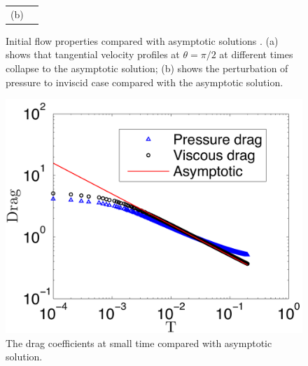 \begin{figure}
\begin{center}
\begin{tabular}[t]{cc}
(b)
\end{tabular}
\end{center}
 \caption[Initial flow velocity and pressure compared with asymptotic solutions]{Initial flow properties compared with asymptotic solutions \cite{bar1975initial}. (a) shows that tangential velocity profiles at $\theta = \pi/2$ at different times collapse to the asymptotic solution; (b) shows the perturbation of pressure to inviscid case compared with the asymptotic solution.}
 \label{fig:InitialVelocity}
\end{figure}

\begin{figure}
\begin{center}
\includegraphics[width=12cm]{./Figures/results/static/InitialDrag.pdf}
\end{center}
 \caption[Initial flow properties compared with asymptotic solutions]{The drag coefficients at small time compared with asymptotic solution.}
 \label{fig:InitialDrag}
\end{figure}


